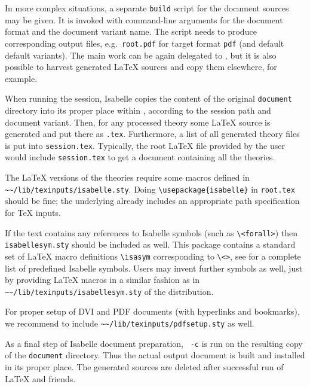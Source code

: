 \begin{isabellebody}
\begin{isamarkuptext}
  In more complex situations, a separate \verb|build| script for
  the document sources may be given.  It is invoked with command-line
  arguments for the document format and the document variant name.
  The script needs to produce corresponding output files, e.g.\
  \verb|root.pdf| for target format \verb|pdf| (and default
  default variants).  The main work can be again delegated to \hyperlink{tool.latex}{\mbox{}}, but it is also possible to harvest generated {\LaTeX}
  sources and copy them elsewhere, for example.

  \medskip When running the session, Isabelle copies the content of
  the original \verb|document| directory into its proper place
  within \hyperlink{setting.ISABELLE-BROWSER-INFO}{\mbox{}}, according to the session
  path and document variant.  Then, for any processed theory 
  some {\LaTeX} source is generated and put there as \isa{A}\verb|.tex|.  Furthermore, a list of all generated theory
  files is put into \verb|session.tex|.  Typically, the root
  {\LaTeX} file provided by the user would include \verb|session.tex| to get a document containing all the theories.

  The {\LaTeX} versions of the theories require some macros defined in
  \verb|~~/lib/texinputs/isabelle.sty|.  Doing \verb|\usepackage{isabelle}| in \verb|root.tex| should be fine;
  the underlying \hyperlink{tool.latex}{\mbox{\isa{\isatool{latex}}}} already includes an appropriate path
  specification for {\TeX} inputs.

  If the text contains any references to Isabelle symbols (such as
  \verb|\|\verb|<forall>|) then \verb|isabellesym.sty| should be included as well.  This package
  contains a standard set of {\LaTeX} macro definitions \verb|\isasym| corresponding to \verb|\|\verb|<|\isa{foo}\verb|>|, see \cite{isabelle-implementation} for a
  complete list of predefined Isabelle symbols.  Users may invent
  further symbols as well, just by providing {\LaTeX} macros in a
  similar fashion as in \verb|~~/lib/texinputs/isabellesym.sty| of
  the distribution.

  For proper setup of DVI and PDF documents (with hyperlinks and
  bookmarks), we recommend to include \verb|~~/lib/texinputs/pdfsetup.sty| as well.

  \medskip As a final step of Isabelle document preparation, \hyperlink{tool.document}{\mbox{}}~\verb|-c| is run on the resulting copy of the
  \verb|document| directory.  Thus the actual output document is
  built and installed in its proper place.  The generated sources are
  deleted after successful run of {\LaTeX} and friends.


\end{isamarkuptext}
\end{isabellebody}

